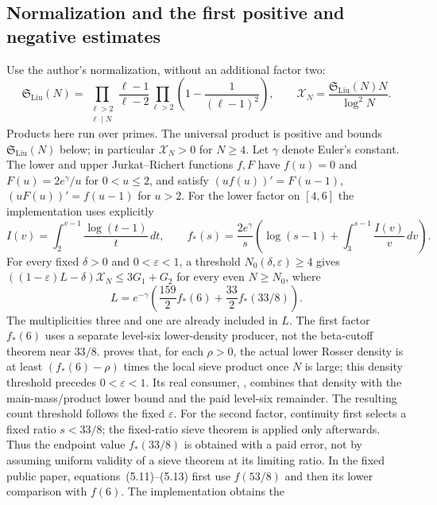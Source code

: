 \subsection{Normalization and the first positive and negative estimates}
Use the author's normalization, without an additional factor two:
\[
 \mathfrak S_{\mathrm{Liu}}(N)=\prod_{\substack{\ell>2\\\ell\mid N}}\frac{\ell-1}{\ell-2}
       \prod_{\ell>2}\left(1-\frac1{(\ell-1)^2}\right),\qquad
 \mathcal X_N=\frac{\mathfrak S_{\mathrm{Liu}}(N)N}{\log^2N}.
\]
Products here run over primes.  The universal product is positive and
bounds $\mathfrak S_{\mathrm{Liu}}(N)$ below; in particular $\mathcal X_N>0$ for $N\ge4$.
Let $\gamma$ denote Euler's constant.  The lower and upper
Jurkat--Richert functions $f,F$ have $f(u)=0$ and $F(u)=2e^{\gamma}/u$
for $0<u\le2$, and satisfy $(uf(u))'=F(u-1)$,
$(uF(u))'=f(u-1)$ for $u>2$.
For the lower factor on $[4,6]$ the implementation uses explicitly
\[
 I(v)=\int_2^{v-1}\frac{\log(t-1)}t\,dt,\qquad
 f_*(s)=\frac{2e^{\gamma}}s
 \left(\log(s-1)+\int_3^{s-1}\frac{I(v)}v\,dv\right).
\]
For every fixed $\delta>0$ and $0<\varepsilon<1$, a threshold
$N_0(\delta,\varepsilon)\ge4$ gives
$((1-\varepsilon)L-\delta)\mathcal X_N\le3G_1+G_2$
for every even $N\ge N_0$, where
\[
 L=e^{-\gamma}\left(\frac{159}{2}f_*(6)
                         +\frac{33}{2}f_*(33/8)\right).
\]
The multiplicities three and one are already included in $L$.
The first factor $f_*(6)$ uses a separate level-six lower-density
producer, not the beta-cutoff theorem near $33/8$.
proves that, for each $\rho>0$, the actual lower Rosser density is at least
$(f_*(6)-\rho)$ times the local sieve product once $N$ is large;
this density threshold precedes $0<\varepsilon<1$.
Its real consumer,
,
combines that density with the main-mass/product lower bound and the
paid level-six remainder.  The resulting count threshold follows the
fixed $\varepsilon$.
For the second factor, continuity first selects a fixed ratio $s<33/8$;
the fixed-ratio sieve theorem is applied only afterwards.  Thus the
endpoint value $f_*(33/8)$ is obtained with a paid error, not by assuming
uniform validity of a sieve theorem at its limiting ratio.
In the fixed public paper, equations~(5.11)--(5.13) first use $f(53/8)$
and then its lower comparison with $f(6)$. The implementation obtains the
